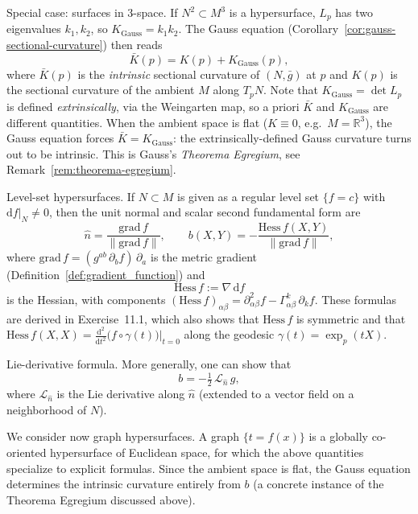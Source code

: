 {Special case: surfaces in 3-space.}
If $N^2 \subset M^3$ is a hypersurface, $L_p$ has two eigenvalues $k_1, k_2$, so $K_{\mathrm{Gauss}} = k_1 k_2$. The Gauss equation (Corollary~\ref{cor:gauss-sectional-curvature}) then reads
\[
\bar K(p) = K(p) + K_{\mathrm{Gauss}}(p),
\]
where $\bar K(p)$ is the \emph{intrinsic} sectional curvature of $(N, \bar g)$ at $p$ and $K(p)$ is the sectional curvature of the ambient $M$ along $T_pN$. Note that $K_{\mathrm{Gauss}} = \det L_p$ is defined \emph{extrinsically}, via the Weingarten map, so a priori $\bar K$ and $K_{\mathrm{Gauss}}$ are different quantities. When the ambient space is flat ($K \equiv 0$, e.g.\ $M = \mathbb{R}^3$), the Gauss equation forces $\bar K = K_{\mathrm{Gauss}}$: the extrinsically-defined Gauss curvature turns out to be intrinsic. This is Gauss's \emph{Theorema Egregium}, see Remark~\ref{rem:theorema-egregium}.

{Level-set hypersurfaces.}
If $N \subset M$ is given as a regular level set $\{f = c\}$ with $\mathrm{d}f|_N \neq 0$, then the unit normal and scalar second fundamental form are
\[
\hat n = \frac{\mathrm{grad}\,f}{\|\mathrm{grad}\,f\|}, \qquad b(X, Y) = -\frac{\mathrm{Hess}\,f(X, Y)}{\|\mathrm{grad}\,f\|},
\]
where $\mathrm{grad}\,f = (g^{ab}\,\partial_b f)\,\partial_a$ is the metric gradient (Definition~\ref{def:gradient_function}) and 
$$\mathrm{Hess}\,f := \nabla\,\mathrm{d}f$$ 
is the Hessian, with components $(\mathrm{Hess}\,f)_{\alpha\beta} = \partial^2_{\alpha\beta} f - \Gamma^k_{\alpha\beta}\,\partial_k f$. These formulas are derived in Exercise~11.1, which also shows that $\mathrm{Hess}\,f$ is symmetric and that $\mathrm{Hess}\,f(X, X) = \frac{\mathrm{d}^2}{\mathrm{d}t^2}\big(f \circ \gamma(t)\big)\big|_{t=0}$ along the geodesic $\gamma(t) = \exp_p(tX)$.

{Lie-derivative formula.}
More generally, one can show that
\[
b = -\tfrac{1}{2}\,\mathcal{L}_{\hat n}\, g,
\]
where $\mathcal{L}_{\hat n}$ is the Lie derivative along $\hat n$ (extended to a vector field on a neighborhood of $N$).

We consider now graph hypersurfaces. A graph $\{t = f(x)\}$ is a globally co-oriented hypersurface of Euclidean space, for which the above quantities specialize to explicit formulas. Since the ambient space is flat, the Gauss equation determines the intrinsic curvature entirely from $b$ (a concrete instance of the Theorema Egregium discussed above).

